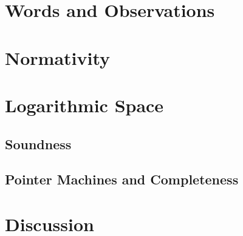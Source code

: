 \section{Words and Observations}\label{sec:words}
	
	
	
\section{Normativity}\label{sec:normativity}
	

\section{Logarithmic Space}\label{sec:logspace}
	\subsection{Soundness}
	
	\subsection{Pointer Machines and Completeness}
	

\section{Discussion}




\thispagestyle{empty}
